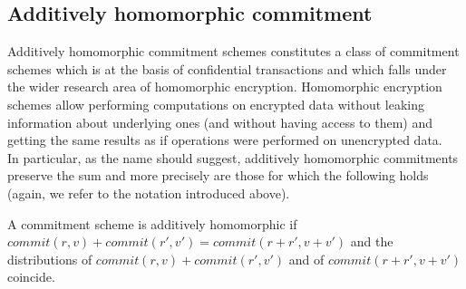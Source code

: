 \subsection{Additively homomorphic commitment}
\label{add_homomorphic_commit}
Additively homomorphic commitment schemes constitutes a class of commitment schemes which is at the basis of confidential transactions and which falls under the wider research area of homomorphic encryption. Homomorphic encryption schemes allow performing computations on encrypted data without leaking information about underlying ones (and without having access to them) and getting the same results as if operations were performed on unencrypted data.\\
In particular, as the name should suggest, additively homomorphic commitments preserve the sum and more precisely are those for which the following holds (again, we refer to the notation introduced above).
\begin{mydef}
\label{additively_homo_def}
    A commitment scheme is additively homomorphic if\\ $commit(r,v) + commit(r',v') = commit(r+r',v+v')$ and the distributions of $commit(r,v) + commit(r',v')$ and of $commit(r+r',v+v')$ coincide.
\end{mydef}


